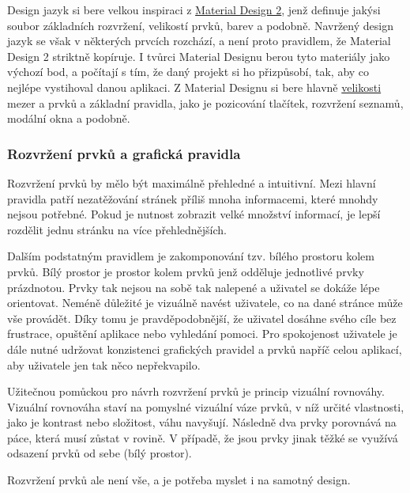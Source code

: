 	Design jazyk si bere velkou inspiraci z \href{https://material.io/}{Material Design 2}, jenž definuje jakýsi soubor
	základních rozvržení, velikostí prvků, barev a podobně.
	Navržený design jazyk se však v některých prvcích rozchází, a není proto pravidlem,
	že Material Design 2 striktně kopíruje.
	I tvůrci Material Designu berou tyto materiály jako výchozí bod, a počítají s tím, že daný projekt si ho přizpůsobí,
	tak, aby co nejlépe vystihoval danou aplikaci.
	Z Material Designu si bere hlavně \href{https://material.io/design/layout/spacing-methods.html#baseline-grid}{velikosti}
	mezer a prvků a základní pravidla, jako je pozicování tlačítek, rozvržení seznamů, modální okna a podobně.

		\subsubsection{Rozvržení prvků a grafická pravidla}

		Rozvržení prvků by mělo být maximálně přehledné a intuitivní.
		Mezi hlavní pravidla patří nezatěžování stránek příliš mnoha informacemi, které mnohdy nejsou potřebné.
		Pokud je nutnost zobrazit velké množství informací, je lepší rozdělit jednu stránku na více přehlednějších.

		Dalším podstatným pravidlem je zakomponování tzv. bílého prostoru kolem prvků.
		Bílý prostor je prostor kolem prvků jenž odděluje jednotlivé prvky prázdnotou.
		Prvky tak nejsou na sobě tak nalepené a uživatel se dokáže lépe orientovat.
		Neméně důležité je vizuálně navést uživatele, co na dané stránce může vše provádět.
		Díky tomu je pravděpodobnější, že uživatel dosáhne svého cíle bez frustrace, opuštění aplikace nebo vyhledání
		pomoci.
		Pro spokojenost uživatele je dále nutné udržovat konzistenci grafických pravidel a prvků
		napříč celou aplikací, aby uživatele jen tak něco nepřekvapilo. \cite{create_great_ux}

		Užitečnou pomůckou pro návrh rozvržení prvků je princip vizuální rovnováhy.
		Vizuální rovnováha staví na pomyslné vizuální váze prvků, v níž určité vlastnosti, jako je kontrast nebo složitost,
		váhu navyšují.
		Následně dva prvky porovnává na páce, která musí zůstat v rovině.
		V případě, že jsou prvky jinak těžké se využívá odsazení prvků od sebe (bílý prostor). \cite{vizualni_rovnovaha}


		Rozvržení prvků ale není vše, a je potřeba myslet i na samotný design.

